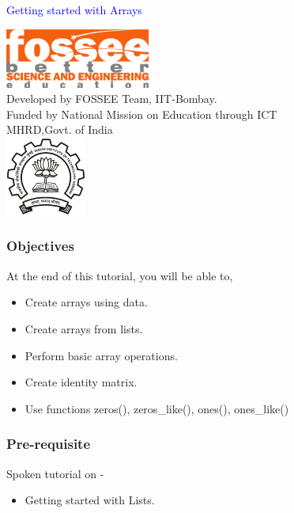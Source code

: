 \documentclass[presentation]{beamer}
\title{}
\author{FOSSEE}
\date{}
\begin{document}
\begin{frame}

\begin{center}
\vspace{12pt}
\textcolor{blue}{\huge Getting started with Arrays}
\end{center}
\vspace{18pt}
\begin{center}
\vspace{10pt}
\includegraphics[scale=0.95]{../images/fossee-logo.png}\\
\vspace{5pt}
\scriptsize Developed by FOSSEE Team, IIT-Bombay. \\ 
\scriptsize Funded by National Mission on Education through ICT\\
\scriptsize  MHRD,Govt. of India\\
\includegraphics[scale=0.30]{../images/iitb-logo.png}\\
\end{center}
\end{frame}
\begin{frame}
\frametitle{Objectives}
\label{sec-2}

  At the end of this tutorial, you will be able to, 


\begin{itemize}
\item Create arrays using data.
\item Create arrays from lists.
\item Perform basic array operations.
\item Create identity matrix.
\item Use functions zeros(), zeros\_like(), ones(), ones\_like()
\end{itemize}
\end{frame}
\begin{frame}
\frametitle{Pre-requisite}
\label{sec-3}

  Spoken tutorial on -

\begin{itemize}
\item Getting started with Lists.
\end{itemize}
\end{frame}
\end{document}
